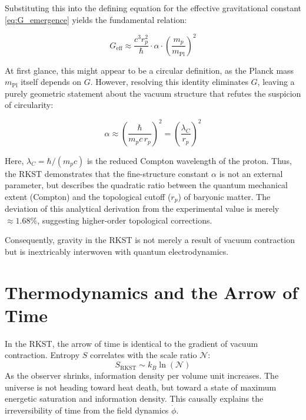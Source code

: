 \documentclass[11pt,a4paper]{article}
\begin{document}
Substituting this into the defining equation for the effective gravitational constant \eqref{eq:G_emergence} yields the fundamental relation:

\begin{equation}
G_{\text{eff}} \approx \frac{c^3 r_p^2}{\hbar} \cdot \alpha \cdot \left(\frac{m_p}{m_{\text{Pl}}}\right)^2
\end{equation}

At first glance, this might appear to be a circular definition, as the Planck mass $m_{\text{Pl}}$ itself depends on $G$. However, resolving this identity eliminates $G$, leaving a purely geometric statement about the vacuum structure that refutes the suspicion of circularity:

\begin{equation}
\alpha \approx \left( \frac{\hbar}{m_p c \, r_p} \right)^2 = \left( \frac{\lambda_C}{r_p} \right)^2
\end{equation}

Here, $\lambda_C = \hbar / (m_p c)$ is the reduced Compton wavelength of the proton.
Thus, the RKST demonstrates that the fine-structure constant $\alpha$ is not an external parameter, but describes the quadratic ratio between the quantum mechanical extent (Compton) and the topological cutoff ($r_p$) of baryonic matter. The deviation of this analytical derivation from the experimental value is merely $\approx 1.68\%$, suggesting higher-order topological corrections.

Consequently, gravity in the RKST is not merely a result of vacuum contraction but is inextricably interwoven with quantum electrodynamics.

\section{Thermodynamics and the Arrow of Time}
\label{sec:thermo}

In the RKST, the arrow of time is identical to the gradient of vacuum contraction. Entropy $S$ correlates with the scale ratio $\mathcal{N}$:
\begin{equation}
S_{\text{RKST}} \sim k_B \ln(\mathcal{N})
\end{equation}
As the observer shrinks, information density per volume unit increases. The universe is not heading toward heat death, but toward a state of maximum energetic saturation and information density. This causally explains the irreversibility of time from the field dynamics $\dot{\phi}$.
\end{document}

